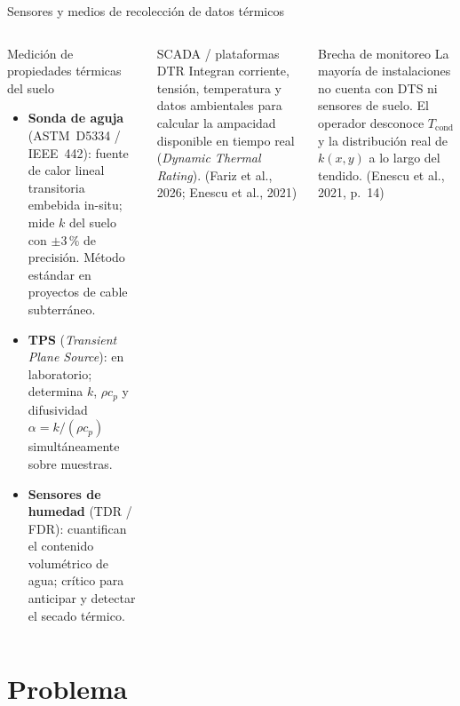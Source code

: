 \documentclass[aspectratio=169]{beamer}
\newcommand{\refcite}[1]{{\footnotesize\color{gray!70!black} #1}}
\begin{document}
\begin{frame}{Sensores y medios de recolección de datos térmicos}
\begin{columns}[T]
\begin{block}{Medición de propiedades térmicas del suelo}
\scriptsize\justifying
\begin{itemize}[leftmargin=*,itemsep=1pt]
    \item \textbf{Sonda de aguja} (ASTM~D5334 / IEEE~442): fuente de
          calor lineal transitoria embebida in-situ; mide $k$ del
          suelo con $\pm$3\,\% de precisión. Método estándar en
          proyectos de cable subterráneo.
    \item \textbf{TPS} (\textit{Transient Plane Source}): en
          laboratorio; determina $k$, $\rho c_p$ y difusividad
          $\alpha = k/(\rho c_p)$ simultáneamente sobre muestras.
    \item \textbf{Sensores de humedad} (TDR / FDR): cuantifican el
          contenido volumétrico de agua; crítico para anticipar
          y detectar el secado térmico.
\end{itemize}
\end{block}
\vspace{0.15em}
\begin{block}{SCADA / plataformas DTR}
\scriptsize
Integran corriente, tensión, temperatura y datos ambientales para
calcular la ampacidad disponible en tiempo real
(\textit{Dynamic Thermal Rating}).
\refcite{(Fariz et al., 2026; Enescu et al., 2021)}
\end{block}
\vspace{0.3em}
\begin{alertblock}{Brecha de monitoreo}
\scriptsize
La mayoría de instalaciones no cuenta con DTS ni sensores de suelo.
El operador desconoce $T_\text{cond}$ y la distribución real de
$k(x,y)$ a lo largo del tendido.
\refcite{(Enescu et al., 2021, p.~14)}
\end{alertblock}
\end{columns}
\end{frame}


\section{Problema}
\end{document}
